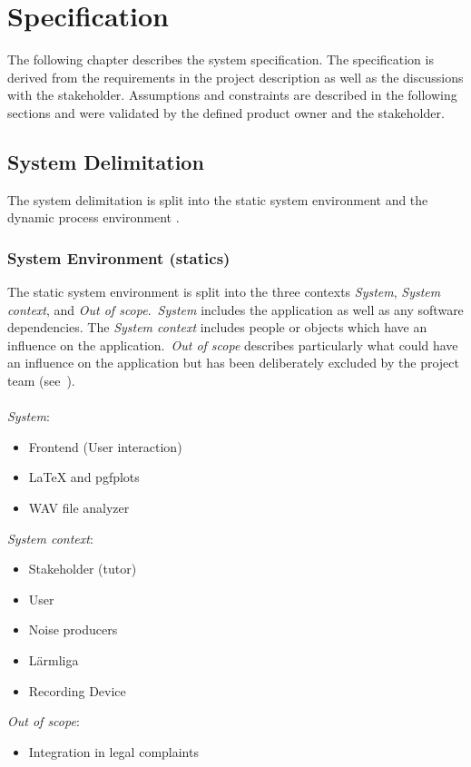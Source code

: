 \section{Specification}\label{sec:specification}
The following chapter describes the system specification.
The specification is derived from the requirements in the project description
as well as the discussions with the stakeholder.
Assumptions and constraints are described in the following sections and were validated by
the defined product owner and the stakeholder.

\subsection{System Delimitation}\label{subsec:system-delimination}
The system delimitation is split into the static system environment 
and the dynamic process environment .

\subsubsection{System Environment (statics)}\label{subsubsec:system_environment}
The static system environment is split into the three contexts \textit{System}, \textit{System context}, and \textit{Out of scope}.\ \textit{System} includes the application
as well as any software dependencies.
The \textit{System context} includes people or objects which have an influence on the application.\ \textit{Out of scope} describes particularly
what could have an influence on the application but has been deliberately excluded by the project team (see~). \\~\\
\textit{System}:
\begin{itemize}
    \item Frontend (User interaction)
    \item LaTeX and pgfplots
    \item WAV file analyzer
\end{itemize}
\textit{System context}:
\begin{itemize}
    \item Stakeholder (tutor)
    \item User
    \item Noise producers
    \item Lärmliga
    \item Recording Device
\end{itemize}
\textit{Out of scope}:
\begin{itemize}
    \item Integration in legal complaints
\end{itemize}

